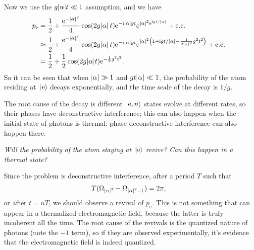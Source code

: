 \documentclass[hyperref, a4paper]{article}
\newcommand*{\ii}{\mathrm{i}}
\newcommand*{\ee}{\mathrm{e}}
\newcommand*{\kete}{\ket*{\text{e}}}
\newcommand*{\pope}{p_{\text{e}}}
\begin{document}
Now we use the $g \abs{\alpha} t \ll 1$ assumption, and we have 
\begin{equation}
    \begin{aligned}
        \pope &= \frac{1}{2} + \frac{\ee^{- \abs*{\alpha}^2}}{4} 
        \cos( 2 g \abs*{\alpha} t) \ee^{- \ii \abs{\alpha} g t} \ee^{\abs{\alpha}^2 \ee^{\ii g t / \abs{\alpha}}} + \text{c.c.} \\
        &\approx  \frac{1}{2} + \frac{\ee^{- \abs*{\alpha}^2}}{4} 
        \cos( 2 g \abs*{\alpha} t) \ee^{- \ii \abs{\alpha} g t} \ee^{\abs{\alpha}^2 \left(1 + \ii g t / \abs{\alpha} - \frac{1}{2 \abs{\alpha}^2} g^2 t^2  \right) } + \text{c.c.} \\
        &= \frac{1}{2} + \frac{1}{2} \cos (2 g \abs{\alpha} t) \ee^{- \frac{1}{2} g^2 t^2}.
    \end{aligned}
\end{equation}
So it can be seen that when $\abs{\alpha} \gg 1$ and $g t \abs{\alpha} \ll 1$,
the probability of the atom residing at $\kete$ decays exponentially,
and the time scale of the decay is $1/g$.

The root cause of the decay is different $\ket*{\text{e}, n}$ states evolve at different rates,
so their phases have deconstructive interference;
this can also happen when the initial state of photons is thermal:
phase deconstructive interference can also happen there.

\textit{Will the probability of the atom staying at $\kete$ revive? Can this happen in a thermal state?}

Since the problem is deconstructive interference,
after a period $T$ such that 
\begin{equation}
    T (\Omega_{\abs*{\alpha}^2} - \Omega_{\abs*{\alpha}^2-1}) = 2\pi,
\end{equation}
or after $t=nT$, we should observe a revival of $\pope$.
This is not something that can appear in a thermalized electromagnetic field,
because the latter is truly incoherent all the time.
The root cause of the revivals is the quantized nature of photons (note the $-1$ term),
so if they are observed experimentally, 
it's evidence that the electromagnetic field is indeed quantized. 

\textit{}
\end{document}
